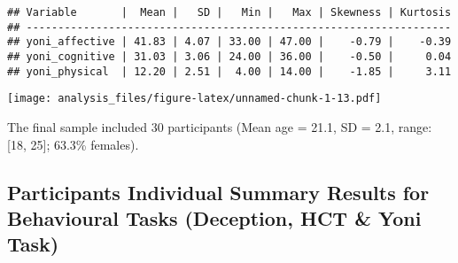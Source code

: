 \documentclass[
]{article}
\newenvironment{Shaded}{\begin{snugshade}}{\end{snugshade}}
\newcommand{\DataTypeTok}[1]{\textcolor[rgb]{0.13,0.29,0.53}{#1}}
\newcommand{\DecValTok}[1]{\textcolor[rgb]{0.00,0.00,0.81}{#1}}
\newcommand{\KeywordTok}[1]{\textcolor[rgb]{0.13,0.29,0.53}{\textbf{#1}}}
\newcommand{\NormalTok}[1]{#1}
\newcommand{\OperatorTok}[1]{\textcolor[rgb]{0.81,0.36,0.00}{\textbf{#1}}}
\newcommand{\StringTok}[1]{\textcolor[rgb]{0.31,0.60,0.02}{#1}}
\begin{document}
\begin{verbatim}
## Variable       |  Mean |   SD |   Min |   Max | Skewness | Kurtosis
## -------------------------------------------------------------------
## yoni_affective | 41.83 | 4.07 | 33.00 | 47.00 |    -0.79 |    -0.39
## yoni_cognitive | 31.03 | 3.06 | 24.00 | 36.00 |    -0.50 |     0.04
## yoni_physical  | 12.20 | 2.51 |  4.00 | 14.00 |    -1.85 |     3.11
\end{verbatim}

\texttt{[image: analysis\_files/figure-latex/unnamed-chunk-1-13.pdf]}

The final sample included 30 participants (Mean age = 21.1, SD = 2.1,
range: {[}18, 25{]}; 63.3\% females).

\hypertarget{participants-individual-summary-results-for-behavioural-tasks-deception-hct-yoni-task}{%
\subsection{Participants Individual Summary Results for Behavioural
Tasks (Deception, HCT \& Yoni
Task)}\label{participants-individual-summary-results-for-behavioural-tasks-deception-hct-yoni-task}}

\begin{Shaded}
\end{Shaded}
\end{document}
